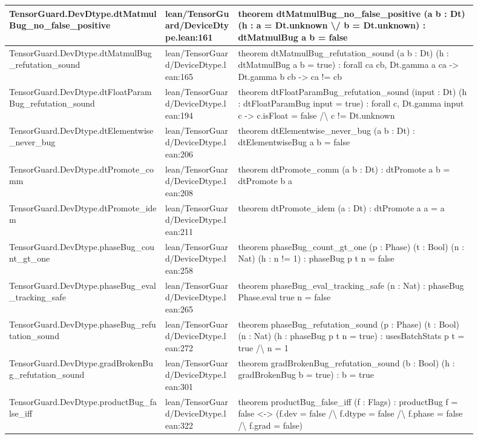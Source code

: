 \documentclass[10pt]{article}
\begin{document}
\begin{longtable}{|p{0.30\linewidth}|p{0.14\linewidth}|p{0.46\linewidth}|}
\hline
TensorGuard.DevDtype.dtMatmulBug\_no\_false\_positive & lean/TensorGuard/DeviceDtype.lean:161 & theorem dtMatmulBug\_no\_false\_positive (a b : Dt) (h : a = Dt.unknown \textbackslash{}/ b = Dt.unknown) : dtMatmulBug a b = false \\
\hline
TensorGuard.DevDtype.dtMatmulBug\_refutation\_sound & lean/TensorGuard/DeviceDtype.lean:165 & theorem dtMatmulBug\_refutation\_sound (a b : Dt) (h : dtMatmulBug a b = true) : forall ca cb, Dt.gamma a ca -> Dt.gamma b cb -> ca != cb \\
\hline
TensorGuard.DevDtype.dtFloatParamBug\_refutation\_sound & lean/TensorGuard/DeviceDtype.lean:194 & theorem dtFloatParamBug\_refutation\_sound (input : Dt) (h : dtFloatParamBug input = true) : forall c, Dt.gamma input c -> c.isFloat = false /\textbackslash{} c != Dt.unknown \\
\hline
TensorGuard.DevDtype.dtElementwise\_never\_bug & lean/TensorGuard/DeviceDtype.lean:206 & theorem dtElementwise\_never\_bug (a b : Dt) : dtElementwiseBug a b = false \\
\hline
TensorGuard.DevDtype.dtPromote\_comm & lean/TensorGuard/DeviceDtype.lean:208 & theorem dtPromote\_comm (a b : Dt) : dtPromote a b = dtPromote b a \\
\hline
TensorGuard.DevDtype.dtPromote\_idem & lean/TensorGuard/DeviceDtype.lean:211 & theorem dtPromote\_idem (a : Dt) : dtPromote a a = a \\
\hline
TensorGuard.DevDtype.phaseBug\_count\_gt\_one & lean/TensorGuard/DeviceDtype.lean:258 & theorem phaseBug\_count\_gt\_one (p : Phase) (t : Bool) (n : Nat) (h : n != 1) : phaseBug p t n = false \\
\hline
TensorGuard.DevDtype.phaseBug\_eval\_tracking\_safe & lean/TensorGuard/DeviceDtype.lean:265 & theorem phaseBug\_eval\_tracking\_safe (n : Nat) : phaseBug Phase.eval true n = false \\
\hline
TensorGuard.DevDtype.phaseBug\_refutation\_sound & lean/TensorGuard/DeviceDtype.lean:272 & theorem phaseBug\_refutation\_sound (p : Phase) (t : Bool) (n : Nat) (h : phaseBug p t n = true) : usesBatchStats p t = true /\textbackslash{} n = 1 \\
\hline
TensorGuard.DevDtype.gradBrokenBug\_refutation\_sound & lean/TensorGuard/DeviceDtype.lean:301 & theorem gradBrokenBug\_refutation\_sound (b : Bool) (h : gradBrokenBug b = true) : b = true \\
\hline
TensorGuard.DevDtype.productBug\_false\_iff & lean/TensorGuard/DeviceDtype.lean:322 & theorem productBug\_false\_iff (f : Flags) : productBug f = false <-> (f.dev = false /\textbackslash{} f.dtype = false /\textbackslash{} f.phase = false /\textbackslash{} f.grad = false) \\

\end{longtable}
\end{document}
